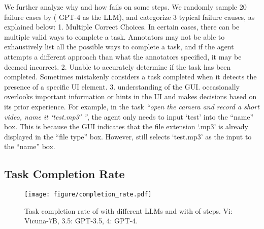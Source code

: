 We further analyze why and how \name fails on some steps. We randomly sample 20 failure cases by \name ( GPT-4 \cite{openai2023gpt4} as the LLM), and categorize 3 typical failure causes, as explained below:
1. Multiple Correct Choices. In certain cases, there can be multiple valid ways to complete a task.
Annotators may not be able to exhaustively list all the possible ways to complete a task, and if the agent attempts a different approach than what the annotators specified, it may be deemed incorrect.
2. Unable to accurately determine if the task has been completed. Sometimes \name mistakenly considers a task completed when it detects the presence of a specific UI element. %
3.  understanding of the GUI. \name occasionally overlooks important information or hints in the UI and makes decisions based on its prior experience. For example, in the task \textit{``open the camera and record a short video, name it `test.mp3' ''}, the agent only needs to input `test' into the ``name'' box. This is because the GUI indicates that the file extension `.mp3' is already displayed in the ``file type'' box. However, \name still selects `test.mp3' as the input to the ``name'' box.

\subsection{Task Completion Rate}
\label{eval:task_completion}

\begin{figure}
    \centering
    \texttt{[image: figure/completion\_rate.pdf]}
    \vspace{-0.8cm}
    \caption{Task completion rate of \name with different LLMs and with  of steps. Vi: Vicuna-7B, 3.5: GPT-3.5, 4: GPT-4.}%
    \label{fig:completion_rate}
    \vspace{-0.2cm}
\end{figure}


